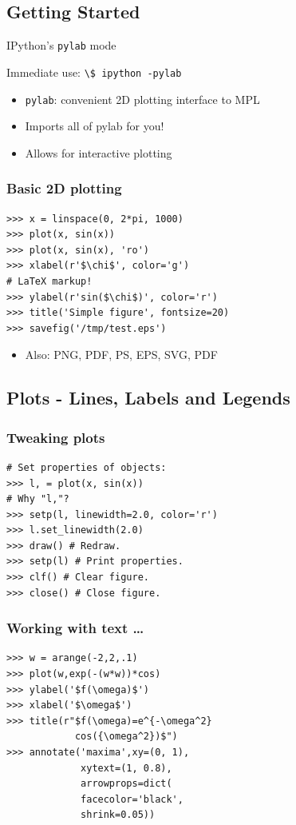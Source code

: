 \documentclass[14pt,compress]{beamer}
\newcounter{time}
\newcommand{\inctime}[1]{\addtocounter{time}{#1}{\tiny \thetime\ m}}
\newcommand{\typ}[1]{\lstinline{#1}}
\begin{document}
\subsection{Getting Started}

\begin{frame}
    {IPython's \typ{pylab} mode}
\begin{block}{Immediate use:}
 \typ{\$ ipython -pylab}
\end{block}
\begin{itemize}
    \item \typ{pylab}: convenient 2D plotting interface to MPL    
    \item Imports all of pylab for you!
    \item Allows for interactive plotting
\end{itemize}
\end{frame}

\begin{frame}[fragile]
    \frametitle{Basic 2D plotting}

\begin{lstlisting}
>>> x = linspace(0, 2*pi, 1000)
>>> plot(x, sin(x)) 
>>> plot(x, sin(x), 'ro')
>>> xlabel(r'$\chi$', color='g')
# LaTeX markup!
>>> ylabel(r'sin($\chi$)', color='r')
>>> title('Simple figure', fontsize=20)
>>> savefig('/tmp/test.eps')
\end{lstlisting}
\begin{itemize}
  \item Also: PNG, PDF, PS, EPS, SVG, PDF
\end{itemize}
\inctime{5}
\end{frame}
       
\subsection{Plots - Lines, Labels and Legends}
\begin{frame}[fragile]
  \frametitle{Tweaking plots}
\begin{lstlisting}
# Set properties of objects:
>>> l, = plot(x, sin(x))
# Why "l,"?
>>> setp(l, linewidth=2.0, color='r')
>>> l.set_linewidth(2.0)
>>> draw() # Redraw.
>>> setp(l) # Print properties.
>>> clf() # Clear figure.
>>> close() # Close figure.
\end{lstlisting}
\end{frame}

\begin{frame}[fragile]
   \frametitle{Working with text \ldots}
\begin{lstlisting}
>>> w = arange(-2,2,.1)
>>> plot(w,exp(-(w*w))*cos)
>>> ylabel('$f(\omega)$')
>>> xlabel('$\omega$')
>>> title(r"$f(\omega)=e^{-\omega^2}
            cos({\omega^2})$")
>>> annotate('maxima',xy=(0, 1), 
             xytext=(1, 0.8), 
             arrowprops=dict(
             facecolor='black', 
             shrink=0.05))
\end{lstlisting}
    
\end{frame}
\end{document}
